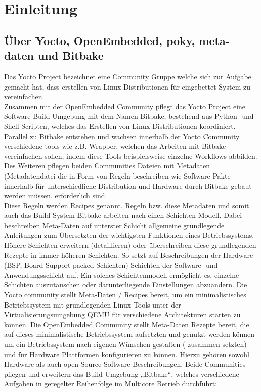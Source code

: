 \chapter{Einleitung} \label{chp:einleitung}


\section{Über Yocto, OpenEmbedded, poky, meta-daten und Bitbake}

Das Yocto Project bezeichnet eine Community Gruppe welche sich zur Aufgabe
gemacht hat, dass erstellen von Linux Distributionen für eingebettet System
zu vereinfachen.  \\

Zusammen mit der OpenEmbedded Community pflegt das \gls{Yocto Project} eine
Software Build Umgebung mit dem Namen \gls{Bitbake}, bestehend aus Python- und
Shell-Scripten, welches das Erstellen von Linux Distributionen koordiniert.
Parallel zu Bitbake  entstehen und wachsen innerhalb der Yocto Community
verschiedene tools wie z.B. Wrapper, welchen das Arbeiten mit Bitbake
vereinfachen sollen, indem diese Tools beispielsweise einzelne \glspl{Workflow}
abbilden.\\

Des Weiteren pflegen beiden Communities Dateien mit \gls{Metadaten}
(\gls{Metadatendatei} die in Form von Regeln  beschreiben wie Software Pakte
innerhalb für unterschiedliche Distribution und Hardware durch Bitbake gebaut
werden müssen.  erforderlich sind.  \\

Diese Regeln  werden \gls{Recipes} genannt. Regeln bzw. diese Metadaten und
somit auch das Build-System Bitbake arbeiten nach einen Schichten Modell.
Dabei beschreiben Meta-Daten auf unterster Schicht allgemeine grundlegende
Anleitungen zum Übersetzten der wichtigsten Funktionen eines Betriebssystems.
Höhere Schichten erweitern (detaillieren) oder überschreiben diese grundlegenden
Rezepte in immer höheren Schichten. So setzt auf Beschreibungen der Hardware
(BSP, Board Support packed Schichten) Schichten der Software- und
Anwendungsschicht auf. Ein solches Schichtenmodell ermöglicht es, einzelne
Schichten auszutauschen oder darunterliegende Einstellungen abzuändern.
Die Yocto community stellt Meta-Daten / Recipes bereit, um ein
minimalistisches Betriebssystem mit grundlegenden  Linux Tools unter der
Virtualisierungsumgebung QEMU für verschiedene Architekturen starten zu können.
Die OpenEmbedded Community stellt Meta-Daten Rezepte bereit, die auf dieses
minimalistische Betriebssystem aufsetzten und genutzt werden können um ein
Betriebssystem nach eigenen Wünschen gestalten ( zusammen setzten) und für
Hardware Plattformen konfigurieren zu können. Hierzu gehören sowohl Hardware als
auch open Source Software Beschreibungen. Beide Communities pflegen und
erweitern das Build Umgebung „Bitbake“, welches verschiedene Aufgaben in
geregelter
Reihenfolge im Multicore Betrieb durchführt:

